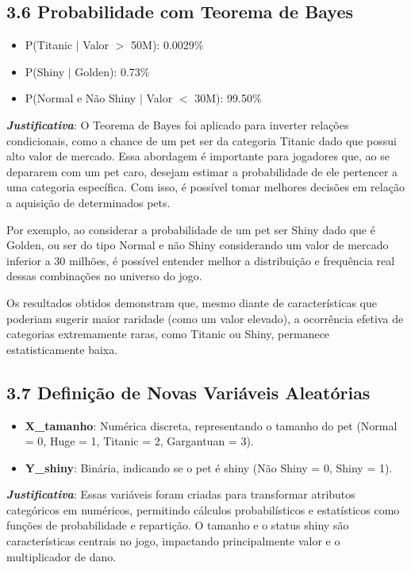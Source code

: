 \documentclass[12pt]{article}
\begin{document}
\subsection*{3.6 Probabilidade com Teorema de Bayes}
\begin{itemize}
    \item P(Titanic $|$ Valor $>$ 50M): 0.0029\%
    \item P(Shiny $|$ Golden): 0.73\%
    \item P(Normal e Não Shiny $|$ Valor $<$ 30M): 99.50\%
\end{itemize} 
\textbf{\textit{Justificativa}}:  O Teorema de Bayes foi aplicado para inverter relações condicionais, como a chance de um pet ser da categoria Titanic dado que possui alto valor de mercado. Essa abordagem é importante para jogadores que, ao se depararem com um pet caro, desejam estimar a probabilidade de ele pertencer a uma categoria específica. Com isso, é possível tomar melhores decisões em relação a aquisição de determinados pets.   

Por exemplo, ao considerar a probabilidade de um pet ser Shiny dado que é Golden, ou ser do tipo Normal e não Shiny considerando um valor de mercado inferior a 30 milhões, é possível entender melhor a distribuição e frequência real dessas combinações no universo do jogo.

Os resultados obtidos demonstram que, mesmo diante de características que poderiam sugerir maior raridade (como um valor elevado), a ocorrência efetiva de categorias extremamente raras, como Titanic ou Shiny, permanece estatisticamente baixa. 

\subsection*{3.7 Definição de Novas Variáveis Aleatórias}
\begin{itemize}
    \item \textbf{X\_tamanho}: Numérica discreta, representando o tamanho do pet (Normal = 0, Huge = 1, Titanic = 2, Gargantuan = 3).
    \item \textbf{Y\_shiny}: Binária, indicando se o pet é shiny (Não Shiny = 0, Shiny = 1).
\end{itemize}
\textbf{\textit{Justificativa}}: Essas variáveis foram criadas para transformar atributos categóricos em numéricos, permitindo cálculos probabilísticos e estatísticos como funções de probabilidade e repartição. O tamanho e o status shiny são características centrais no jogo, impactando principalmente valor e o multiplicador de dano.
\end{document}
